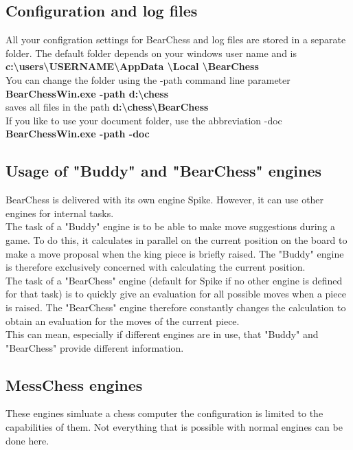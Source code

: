 \documentclass[11pt,a4paper]{article}
\begin{document}
\subsection{Configuration and log files}
All your configration settings for BearChess and log files are stored in a separate folder. The default folder depends on your windows user name and is\\
\textbf{c:\textbackslash users\textbackslash USERNAME\textbackslash AppData \textbackslash Local \textbackslash BearChess}\\
You can change the folder using the -path command line parameter\\
\textbf{BearChessWin.exe -path d:\textbackslash chess} \\ 
saves all files in the path \textbf{d:\textbackslash chess\textbackslash BearChess}\\
If you like to use your document folder, use the abbreviation -doc\\
\textbf{BearChessWin.exe -path -doc} \\ 

\subsection{Usage of "Buddy" and "BearChess" engines} \label{BuddyBearChessEngines}
BearChess is delivered with its own engine Spike. However, it can use other engines for internal tasks.\\
The task of a "Buddy" engine is to be able to make move suggestions during a game. To do this, it calculates in parallel on the current position on the board to make a move proposal when the king piece is briefly raised. The "Buddy" engine is therefore exclusively concerned with calculating the current position.\\
The task of a "BearChess" engine (default for Spike if no other engine is defined for that task) is to quickly give an evaluation for all possible moves when a piece is raised. The "BearChess" engine therefore constantly changes the calculation to obtain an evaluation for the moves of the current piece.\\
This can mean, especially if different engines are in use, that "Buddy" and "BearChess" provide different information. 

\subsection{MessChess engines}
These engines simluate a chess computer the configuration is limited to the capabilities of them. Not everything that is possible with normal engines can be done here. 
\end{document}
